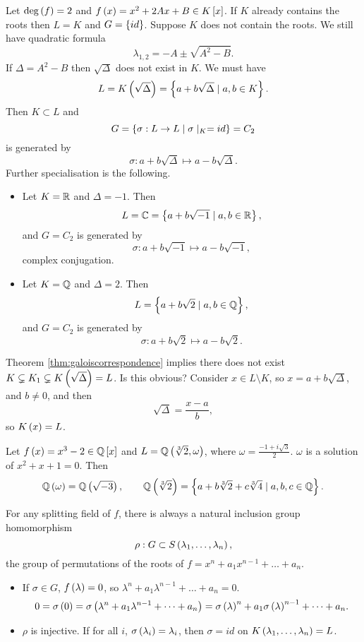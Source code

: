 \begin{example}
Let $ \deg\left( f \right) = 2 $ and $ f\left( x \right) = x^2 + 2Ax + B \in K\left[ x \right] $. If $ K $ already contains the roots then $ L = K $ and $ G = \left\{ id \right\} $. Suppose $ K $ does not contain the roots. We still have quadratic formula
$$ \lambda_{1, 2} = -A \pm \sqrt{A^2 - B}. $$
If $ \Delta = A^2 - B $ then $ \sqrt{\Delta} $ does not exist in $ K $. We must have
$$ L = K\left( \sqrt{\Delta} \right) = \left\{ a + b\sqrt{\Delta} \mid a, b \in K \right\}. $$
Then $ K \subset L $ and
$$ G = \left\{ \sigma : L \to L \mid \sigma \mid_K = id \right\} = C_2 $$
is generated by
$$ \sigma : a + b\sqrt{\Delta} \mapsto a - b\sqrt{\Delta}. $$
Further specialisation is the following.
\begin{itemize}
\item Let $ K = \mathbb{R} $ and $ \Delta = -1 $. Then
$$ L = \mathbb{C} = \left\{ a + b\sqrt{-1} \mid a, b \in \mathbb{R} \right\}, $$
and $ G = C_2 $ is generated by
$$ \sigma : a + b\sqrt{-1} \mapsto a - b\sqrt{-1}, $$
complex conjugation.
\item Let $ K = \mathbb{Q} $ and $ \Delta = 2 $. Then
$$ L = \left\{ a + b\sqrt{2} \mid a, b \in \mathbb{Q} \right\}, $$
and $ G = C_2 $ is generated by
$$ \sigma : a + b\sqrt{2} \mapsto a - b\sqrt{2}. $$
\end{itemize}
Theorem \ref{thm:galoiscorrespondence} implies there does not exist $ K \subsetneq K_1 \subsetneq K\left( \sqrt{\Delta} \right) = L $. Is this obvious? Consider $ x \in L \setminus K $, so $ x = a + b\sqrt{\Delta} $, and $ b \ne 0 $, and then
$$ \sqrt{\Delta} = \dfrac{x - a}{b}, $$
so $ K\left( x \right) = L $.
\end{example}

\begin{example}
Let $ f\left( x \right) = x^3 - 2 \in \mathbb{Q}\left[ x \right] $ and $ L = \mathbb{Q}\left( \sqrt[3]{2}, \omega \right) $, where $ \omega = \tfrac{-1 + i\sqrt{3}}{2} $. $ \omega $ is a solution of $ x^2 + x + 1 = 0 $. Then
$$ \mathbb{Q}\left( \omega \right) = \mathbb{Q}\left( \sqrt{-3} \right), \qquad \mathbb{Q}\left( \sqrt[3]{2} \right) = \left\{ a + b\sqrt[3]{2} + c\sqrt[3]{4} \mid a, b, c \in \mathbb{Q} \right\}. $$
\end{example}

\begin{remark}
\label{rem:inclusionhomomorphism}
For any splitting field of $ f $, there is always a natural inclusion group homomorphism
$$ \rho : G \subset S\left( \lambda_1, \dots, \lambda_n \right), $$
the group of permutations of the roots of $ f = x^n + a_1x^{n - 1} + \dots + a_n $.
\begin{itemize}
\item If $ \sigma \in G $, $ f\left( \lambda \right) = 0 $, so $ \lambda^n + a_1\lambda^{n - 1} + \dots + a_n = 0 $.
$$ 0 = \sigma\left( 0 \right) = \sigma\left( \lambda^n + a_1\lambda^{n - 1} + \dots + a_n \right) = \sigma\left( \lambda \right)^n + a_1\sigma\left( \lambda \right)^{n - 1} + \dots + a_n. $$
\item $ \rho $ is injective. If for all $ i $, $ \sigma\left( \lambda_i \right) = \lambda_i $, then $ \sigma = id $ on $ K\left( \lambda_1, \dots, \lambda_n \right) = L $.
\end{itemize}
\end{remark}

